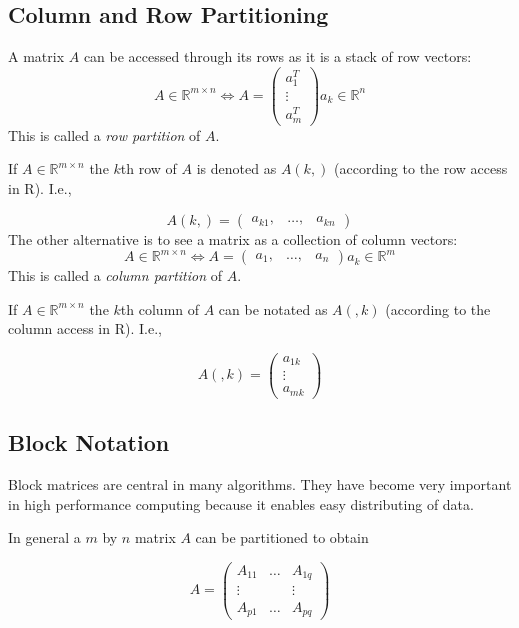 \subsection{Column and Row Partitioning}

A matrix $A$ can be accessed through its rows as it is a stack of row
vectors:
$$ A \in \mathbb{R}^{m \times n} \Longleftrightarrow A = 
\left( \begin{array}{c}
a_{1}^T \\
\vdots \\
a_{m}^T 
\end{array} \right)
a_{k} \in \mathbb{R}^n 
$$
This is called a \textit{row partition} of $A$.


If $A \in \mathbb{R}^{m \times n}$ the $k$th row of $A$ is denoted
as $A(k,)$ (according to the row access in R). I.e.,

$$ A(k,) = \left( \begin{array}{ccc}
a_{k1}, & \ldots, & a_{kn}
\end{array} \right)
$$
The other alternative is to see a matrix as a collection of column
vectors:
$$ A \in \mathbb{R}^{m \times n} \Longleftrightarrow A = 
\left( \begin{array}{ccc}
a_{1}, & \ldots, & a_{n}
\end{array} \right)
a_{k} \in \mathbb{R}^m 
 $$
This is called a \textit{column partition} of $A$.

If $A \in \mathbb{R}^{m \times n}$ the $k$th column of $A$ can be notated
as $A(,k)$ (according to the column access in R). I.e.,

$$ A(,k) = \left( \begin{array}{c}
a_{1k} \\
\vdots \\
a_{mk} 
\end{array} \right)
 $$

\subsection{Block Notation}
\label{sec:blocknot}
Block matrices are central in many algorithms. They have become very
important in high performance computing because it enables
easy distributing of data. 

In general a $m$ by $n$ matrix $A$ can be partitioned to obtain

$$ 
A = \left( \begin{array}{ccc}
A_{11} & \ldots & A_{1q} \\
\vdots &        & \vdots \\
A_{p1} & \ldots & A_{pq}
\end{array} \right)
$$

